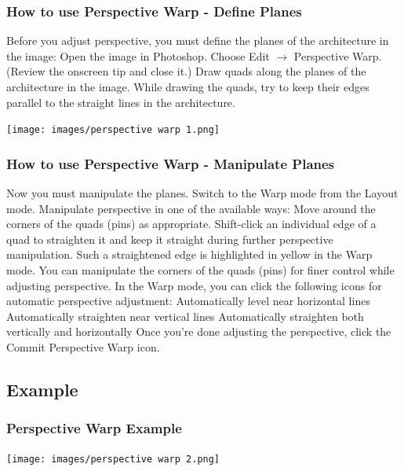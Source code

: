 \documentclass{beamer}
\begin{document}
\begin{frame}
	\frametitle{How to use Perspective Warp - Define Planes}
	\begin{outline}
		\1 Before you adjust perspective, you must define the planes of the architecture in the image:
		\2 Open the image in Photoshop.
		\2 Choose Edit $\rightarrow$ Perspective Warp. (Review the onscreen tip and close it.)
		\2 Draw quads along the planes of the architecture in the image. 
		\3 While drawing the quads, try to keep their edges parallel to the straight lines in the architecture.
	\end{outline}
	\begin{center}
	\texttt{[image: images/perspective warp 1.png]}
\end{center}
\end{frame}

\begin{frame}
	\frametitle{How to use Perspective Warp - Manipulate Planes}
	\begin{outline}
		\1 Now you must manipulate the planes.
		\2 Switch to the Warp mode from the Layout mode.
		\2 Manipulate perspective in one of the available ways:
		\3 Move around the corners of the quads (pins) as appropriate.
		\2 Shift-click an individual edge of a quad to straighten it and keep it straight during further perspective manipulation. 
		\3 Such a straightened edge is highlighted in yellow in the Warp mode. 
		\3 You can manipulate the corners of the quads (pins) for finer control while adjusting perspective.
		\2 In the Warp mode, you can click the following icons for automatic perspective adjustment:
		\3 Automatically level near horizontal lines
		\3 Automatically straighten near vertical lines
		\3 Automatically straighten both vertically and horizontally
		\2 Once you're done adjusting the perspective, click the Commit Perspective Warp icon.
	\end{outline}
\end{frame}

\subsection{Example}	
\begin{frame}
	\frametitle{Perspective Warp Example}
	\begin{center}
		\texttt{[image: images/perspective warp 2.png]}
	\end{center}
\end{frame}
	
\end{document}
